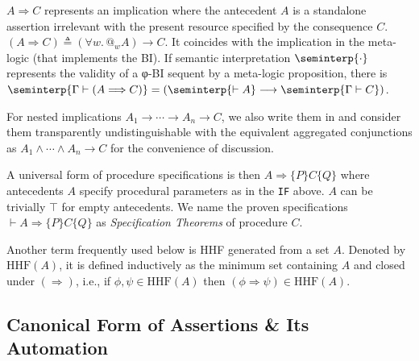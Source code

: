\begin{remark}
$A \Longrightarrow C$ represents an implication where the antecedent $A$ is a standalone assertion irrelevant with the present resource specified by the consequence $C$.
$(A \Longrightarrow C) \triangleq (∀w.\,@_w A) \longrightarrow C$.
It coincides with the implication in the meta-logic (that implements the BI).
If semantic interpretation $\seminterp{\cdot}$ represents the validity of a φ-BI sequent by a meta-logic proposition,
  there is $\seminterp{\Gamma \vdash (A \Longrightarrow C)} = (\seminterp{\vdash A} \longrightarrow \seminterp{\Gamma \vdash C})$.
\end{remark}

\begin{remark}\label{ACF}
  For nested implications $A_1 \longrightarrow \cdots \longrightarrow A_n \longrightarrow C$, we also write them in and consider them transparently undistinguishable with the equivalent aggregated conjunctions as $A_1 \land \cdots \land A_n \longrightarrow C$ for the convenience of discussion.

A universal form of procedure specifications is then $A \Longrightarrow \{P\}C\{Q\}$ where antecedents $A$ specify procedural parameters as in the \texttt{IF} above. $A$ can be trivially $\top$ for empty antecedents.
We name the proven specifications $\vdash A \Longrightarrow \{P\}C\{Q\}$ as \emph{Specification Theorems} of procedure $C$.
\end{remark}

\begin{remark}\label{HHF}
  Another term frequently used below is HHF generated from a set $A$. Denoted by $\mathrm{HHF}(A)$, it is defined inductively as the minimum set containing $A$ and closed under $(\Longrightarrow)$, i.e., if $\phi, \psi \in \mathrm{HHF}(A)$ then $(\phi \Longrightarrow \psi) \in \mathrm{HHF}(A)$.

\end{remark}

\subsection{Canonical Form of Assertions \& Its Automation}

